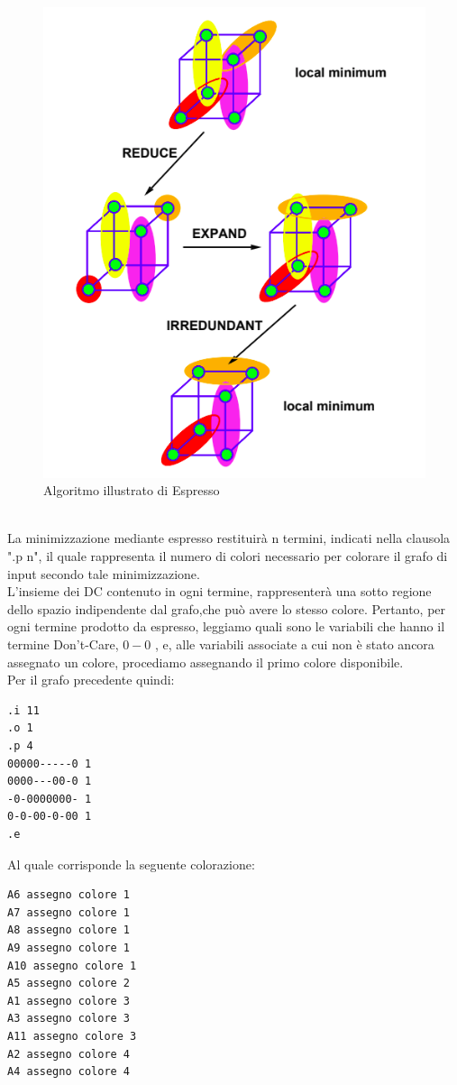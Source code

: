 \documentclass[a4paper,11pt]{article} %
\begin{document}
\begin{figure}[h]
	\centering
	\includegraphics[scale=0.5]{espresso.png}
	\caption{Algoritmo illustrato di Espresso}
\end{figure}
\\La minimizzazione mediante espresso restituirà n termini, indicati nella clausola ".p n", il quale rappresenta il numero di colori necessario per colorare il grafo di input secondo tale minimizzazione.\\
L’insieme dei DC contenuto in ogni termine, rappresenterà una sotto regione dello spazio indipendente dal grafo,che può avere lo stesso colore. Pertanto, per ogni termine prodotto da espresso, leggiamo quali sono le variabili che hanno il termine Don’t-Care, $0 - 0$ , e, alle variabili associate a cui non è stato ancora assegnato un colore, procediamo assegnando il primo colore disponibile.\\
Per il grafo precedente quindi:
\begin{verbatim}
.i 11
.o 1
.p 4
00000-----0 1
0000---00-0 1
-0-0000000- 1
0-0-00-0-00 1
.e
\end{verbatim}
Al quale corrisponde la seguente colorazione:
\begin{verbatim}
A6 assegno colore 1
A7 assegno colore 1
A8 assegno colore 1
A9 assegno colore 1
A10 assegno colore 1
A5 assegno colore 2
A1 assegno colore 3
A3 assegno colore 3
A11 assegno colore 3
A2 assegno colore 4
A4 assegno colore 4
\end{verbatim}
\end{document}
